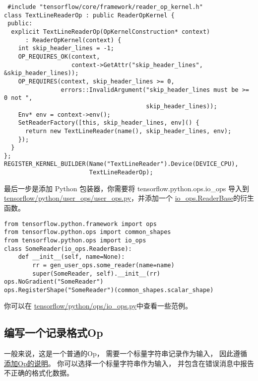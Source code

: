 \begin{verbatim}
 #include "tensorflow/core/framework/reader_op_kernel.h"
class TextLineReaderOp : public ReaderOpKernel {
 public:
  explicit TextLineReaderOp(OpKernelConstruction* context)
      : ReaderOpKernel(context) {
    int skip_header_lines = -1;
    OP_REQUIRES_OK(context,
                   context->GetAttr("skip_header_lines", &skip_header_lines));
    OP_REQUIRES(context, skip_header_lines >= 0,
                errors::InvalidArgument("skip_header_lines must be >= 0 not ",
                                        skip_header_lines));
    Env* env = context->env();
    SetReaderFactory([this, skip_header_lines, env]() {
      return new TextLineReader(name(), skip_header_lines, env);
    });
  }
};
REGISTER_KERNEL_BUILDER(Name("TextLineReader").Device(DEVICE_CPU),
                        TextLineReaderOp);
\end{verbatim}

最后一步是添加 Python 包装器，你需要将 tensorflow.python.ops.io\_ops
导入到
\href{https://tensorflow.googlesource.com/tensorflow/+/master/tensorflow/python/user_ops/user_ops.py}{tensorflow/python/user\_ops/user\_ops.py}，并添加一个
\href{https://tensorflow.googlesource.com/tensorflow/+/master/tensorflow/python/ops/io_ops.py}{io\_ops.ReaderBase}的衍生函数。

\begin{verbatim}
from tensorflow.python.framework import ops
from tensorflow.python.ops import common_shapes
from tensorflow.python.ops import io_ops
class SomeReader(io_ops.ReaderBase):
    def __init__(self, name=None):
        rr = gen_user_ops.some_reader(name=name)
        super(SomeReader, self).__init__(rr)
ops.NoGradient("SomeReader")
ops.RegisterShape("SomeReader")(common_shapes.scalar_shape)
\end{verbatim}

你可以在
\href{https://tensorflow.googlesource.com/tensorflow/+/master/tensorflow/python/ops/io_ops.py}{tensorflow/python/ops/io\_ops.py}中查看一些范例。

\subsection{编写一个记录格式Op
}\label{ux7f16ux5199ux4e00ux4e2aux8bb0ux5f55ux683cux5f0fop}

一般来说，这是一个普通的Op， 需要一个标量字符串记录作为输入， 因此遵循
\href{tensorflow-zh/SOURCE/how_tos/adding_an_op/index.md}{添加Op的说明}。
你可以选择一个标量字符串作为输入，
并包含在错误消息中报告不正确的格式化数据。

